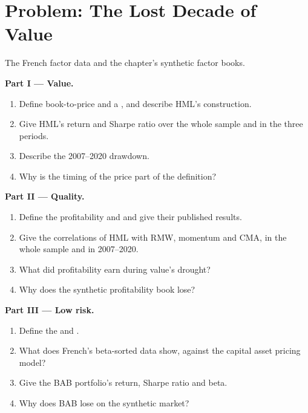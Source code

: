 \section{Problem: The Lost Decade of Value}

\begin{problem}\label{pb:s1:value-quality-and-low-risk:1}
The French factor data and the chapter's synthetic factor books.

\medskip\noindent\textbf{Part I --- Value.}
\begin{enumerate}
\item Define book-to-price and a , and describe HML's construction.
\item Give HML's return and Sharpe ratio over the whole sample and in the three periods.
\item Describe the 2007--2020 drawdown.
\item Why is the timing of the price part of the definition?
\end{enumerate}

\medskip\noindent\textbf{Part II --- Quality.}
\begin{enumerate}[resume]
\item Define the profitability and  and give their published results.
\item Give the correlations of HML with RMW, momentum and CMA, in the whole sample and in 2007--2020.
\item What did profitability earn during value's drought?
\item Why does the synthetic profitability book lose?
\end{enumerate}

\medskip\noindent\textbf{Part III --- Low risk.}
\begin{enumerate}[resume]
\item Define the  and .
\item What does French's beta-sorted data show, against the capital asset pricing model?
\item Give the BAB portfolio's return, Sharpe ratio and beta.
\item Why does BAB lose on the synthetic market?
\end{enumerate}


\end{problem}
